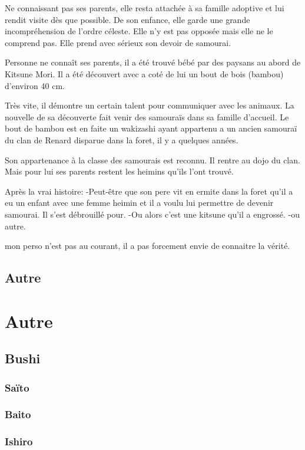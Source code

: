 \documentclass[10pt,a4paper]{book}
\begin{document}
Ne connaissant pas ses parents, elle resta attachée à sa famille adoptive et lui rendit visite dès que possible. De son enfance, elle garde une grande incompréhension de l’ordre céleste. Elle n’y est pas opposée mais elle ne le comprend pas. Elle prend avec sérieux son devoir de samourai.

Personne ne connaît ses parents, il a été trouvé bébé par des paysans au abord de Kitsune Mori.
Il a été découvert avec a coté de lui un bout de bois (bambou) d'environ 40 cm.

Très vite, il démontre un certain talent pour communiquer avec les animaux. La nouvelle de sa découverte fait venir des samouraïs dans sa famille d'accueil. Le bout de bambou est en faite un wakizashi ayant appartenu a un ancien samouraï du clan de Renard disparue dans la foret, il y a quelques années.

Son appartenance à la classe des samourais est reconnu. Il rentre au dojo du clan. Mais pour lui ses parents restent les heimins qu'ils l'ont trouvé.

Après la vrai histoire:
-Peut-être que son pere vit en ermite dans la foret qu'il a eu un enfant avec une femme heimin et il a voulu lui permettre de devenir samourai. Il s'est débrouillé pour.
-Ou alors c'est une kitsune qu'il a engrossé.
-ou autre.

mon perso n'est pas au courant, il a pas forcement envie de connaitre la vérité.

\section{Autre}


\chapter{Autre}

\section{Bushi}

\subsection{Saïto}

\subsection{Baito}

\subsection{Ishiro}
\end{document}
